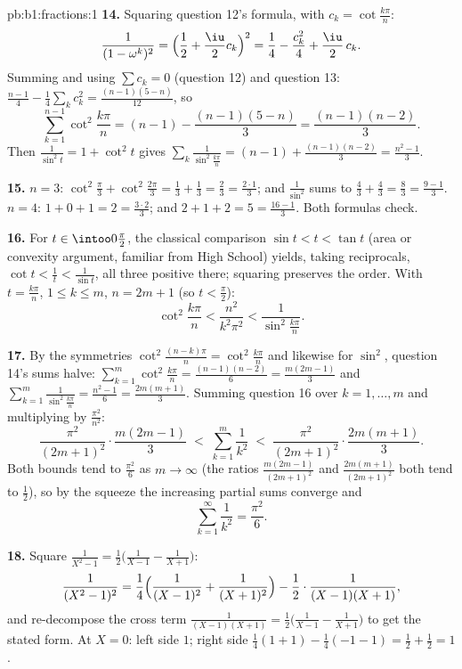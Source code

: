\begin{solution}{pb:b1:fractions:1}
\textbf{14.} Squaring question 12's formula, with $c_k =
\cot\frac{k\pi}n$:
\[
\frac1{(1-\omega^k)^2}
= \Bigl(\frac12 + \frac\iu2 c_k\Bigr)^2
= \frac14 - \frac{c_k^2}4 + \frac\iu2\,c_k .
\]
Summing and using $\sum c_k = 0$ (question 12) and question 13:
$\frac{n-1}4 - \frac14\sum_k c_k^2 = \frac{(n-1)(5-n)}{12}$, so
\[
\sum_{k=1}^{n-1}\cot^2\frac{k\pi}n
= (n-1) - \frac{(n-1)(5-n)}3 = \frac{(n-1)(n-2)}3 .
\]
Then $\frac1{\sin^2t} = 1 + \cot^2t$ gives
$\sum_k\frac1{\sin^2\frac{k\pi}n} = (n-1) +
\frac{(n-1)(n-2)}3 = \frac{n^2-1}3$.

\textbf{15.} $n = 3$: $\cot^2\frac\pi3 + \cot^2\frac{2\pi}3 =
\frac13 + \frac13 = \frac23 = \frac{2\cdot1}3$; and
$\frac1{\sin^2} $ sums to $\frac43 + \frac43 = \frac83 =
\frac{9-1}3$. $n = 4$: $1 + 0 + 1 = 2 = \frac{3\cdot2}3$; and $2
+ 1 + 2 = 5 = \frac{16-1}3$. Both formulas check.

\textbf{16.} For $t \in \intoo0{\frac\pi2}$, the classical
comparison $\sin t < t < \tan t$ (area or convexity argument,
familiar from High School) yields, taking reciprocals, $\cot t <
\frac1t < \frac1{\sin t}$, all three positive there; squaring
preserves the order. With $t = \frac{k\pi}n$, $1 \leq k \leq m$,
$n = 2m+1$ (so $t < \frac\pi2$):
\[
\cot^2\frac{k\pi}n < \frac{n^2}{k^2\pi^2} <
\frac1{\sin^2\frac{k\pi}n} .
\]

\textbf{17.} By the symmetries $\cot^2\frac{(n-k)\pi}n =
\cot^2\frac{k\pi}n$ and likewise for $\sin^2$, question 14's sums
halve: $\sum_{k=1}^{m}\cot^2\frac{k\pi}n = \frac{(n-1)(n-2)}6 =
\frac{m(2m-1)}3$ and $\sum_{k=1}^m\frac1{\sin^2\frac{k\pi}n} =
\frac{n^2-1}6 = \frac{2m(m+1)}3$. Summing question 16 over $k =
1, \dots, m$ and multiplying by $\frac{\pi^2}{n^2}$:
\[
\frac{\pi^2}{(2m+1)^2}\cdot\frac{m(2m-1)}3
\;<\; \sum_{k=1}^{m}\frac1{k^2} \;<\;
\frac{\pi^2}{(2m+1)^2}\cdot\frac{2m(m+1)}3 .
\]
Both bounds tend to $\frac{\pi^2}6$ as $m \to \infty$ (the ratios
$\frac{m(2m-1)}{(2m+1)^2}$ and $\frac{2m(m+1)}{(2m+1)^2}$ both
tend to $\frac12$), so by the squeeze the increasing partial sums
converge and
\[
\sum_{k=1}^{\infty}\frac1{k^2} = \frac{\pi^2}6 .
\]

\textbf{18.} Square $\frac1{X^2-1} = \frac12\bigl(\frac1{X-1} -
\frac1{X+1}\bigr)$:
\[
\frac1{(X^2-1)^2} = \frac14\Bigl(\frac1{(X-1)^2} +
\frac1{(X+1)^2}\Bigr) - \frac12\cdot\frac1{(X-1)(X+1)} ,
\]
and re-decompose the cross term $\frac1{(X-1)(X+1)} =
\frac12\bigl(\frac1{X-1} - \frac1{X+1}\bigr)$ to get the stated
form. At $X = 0$: left side $1$; right side $\frac14(1 + 1) -
\frac14(-1 - 1) = \frac12 + \frac12 = 1$.


\end{solution}
